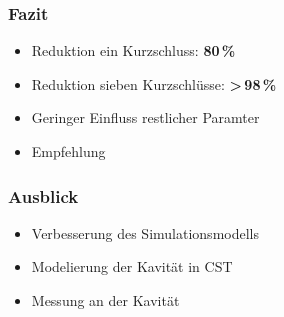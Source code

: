 \documentclass[accentcolor=tud9b, colorbacktitle, inverttitle]{tudbeamer}
\begin{document}
\begin{frame}\frametitle{Fazit}
\begin{itemize}
	\item Reduktion ein Kurzschluss: \textbf{80\,\%}
	\item Reduktion sieben Kurzschl\"usse:  \textbf{>\,98\,\%}
	\item Geringer Einfluss restlicher Paramter
	\item Empfehlung
\end{itemize}
\end{frame}

\begin{frame}\frametitle{Ausblick}
\begin{itemize}
	\item Verbesserung des Simulationsmodells
	\item Modelierung der Kavit\"at in CST
	\item Messung an der Kavit\"at
\end{itemize}
\end{frame}


% 	 
\end{document}
